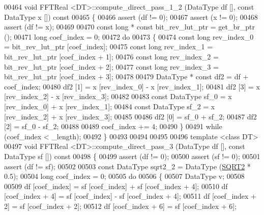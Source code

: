 \begin{DoxyCode}
00464 \textcolor{keywordtype}{void}    FFTReal <DT>::compute\_direct\_pass\_1\_2 (DataType df [], \textcolor{keyword}{const} DataType x []) \textcolor{keyword}{const}
00465 \{
00466     assert (df != 0);
00467     assert (x != 0);
00468     assert (df != x);
00469 
00470     \textcolor{keyword}{const} \textcolor{keywordtype}{long} * \textcolor{keyword}{const}  bit\_rev\_lut\_ptr = get\_br\_ptr ();
00471     \textcolor{keywordtype}{long}                coef\_index = 0;
00472     \textcolor{keywordflow}{do}
00473     \{
00474         \textcolor{keyword}{const} \textcolor{keywordtype}{long}      rev\_index\_0 = bit\_rev\_lut\_ptr [coef\_index];
00475         \textcolor{keyword}{const} \textcolor{keywordtype}{long}      rev\_index\_1 = bit\_rev\_lut\_ptr [coef\_index + 1];
00476         \textcolor{keyword}{const} \textcolor{keywordtype}{long}      rev\_index\_2 = bit\_rev\_lut\_ptr [coef\_index + 2];
00477         \textcolor{keyword}{const} \textcolor{keywordtype}{long}      rev\_index\_3 = bit\_rev\_lut\_ptr [coef\_index + 3];
00478 
00479         DataType    * \textcolor{keyword}{const} df2 = df + coef\_index;
00480         df2 [1] = x [rev\_index\_0] - x [rev\_index\_1];
00481         df2 [3] = x [rev\_index\_2] - x [rev\_index\_3];
00482 
00483         \textcolor{keyword}{const} DataType  sf\_0 = x [rev\_index\_0] + x [rev\_index\_1];
00484         \textcolor{keyword}{const} DataType  sf\_2 = x [rev\_index\_2] + x [rev\_index\_3];
00485 
00486         df2 [0] = sf\_0 + sf\_2;
00487         df2 [2] = sf\_0 - sf\_2;
00488         
00489         coef\_index += 4;
00490     \}
00491     \textcolor{keywordflow}{while} (coef\_index < \_length);
00492 \}
00493 
00494 
00495 
00496 \textcolor{keyword}{template} <\textcolor{keyword}{class} DT>
00497 \textcolor{keywordtype}{void}    FFTReal <DT>::compute\_direct\_pass\_3 (DataType df [], \textcolor{keyword}{const} DataType sf []) \textcolor{keyword}{const}
00498 \{
00499     assert (df != 0);
00500     assert (sf != 0);
00501     assert (df != sf);
00502 
00503     \textcolor{keyword}{const} DataType  sqrt2\_2 = DataType (\hyperlink{a00142_a489004390ad7d791bf53a724c0f07abb}{SQRT2} * 0.5);
00504     \textcolor{keywordtype}{long}                coef\_index = 0;
00505     \textcolor{keywordflow}{do}
00506     \{
00507         DataType            v;
00508 
00509         df [coef\_index] = sf [coef\_index] + sf [coef\_index + 4];
00510         df [coef\_index + 4] = sf [coef\_index] - sf [coef\_index + 4];
00511         df [coef\_index + 2] = sf [coef\_index + 2];
00512         df [coef\_index + 6] = sf [coef\_index + 6];

\end{DoxyCode}

